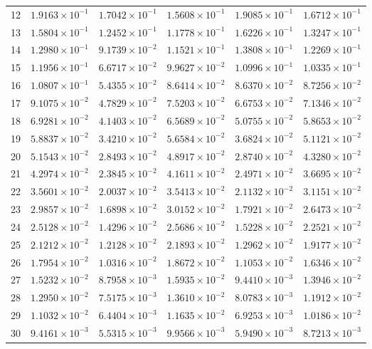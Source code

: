 \begin{table}[H]
\begin{tabular}{@{}rrrrrr@{}}
12 & $1.9163\times10^{-1}$ & $1.7042\times10^{-1}$ & $1.5608\times10^{-1}$ & $1.9085\times10^{-1}$ & $1.6712\times10^{-1}$\\
13 & $1.5804\times10^{-1}$ & $1.2452\times10^{-1}$ & $1.1778\times10^{-1}$ & $1.6226\times10^{-1}$ & $1.3247\times10^{-1}$\\
14 & $1.2980\times10^{-1}$ & $9.1739\times10^{-2}$ & $1.1521\times10^{-1}$ & $1.3808\times10^{-1}$ & $1.2269\times10^{-1}$\\
15 & $1.1956\times10^{-1}$ & $6.6717\times10^{-2}$ & $9.9627\times10^{-2}$ & $1.0996\times10^{-1}$ & $1.0335\times10^{-1}$\\
16 & $1.0807\times10^{-1}$ & $5.4355\times10^{-2}$ & $8.6414\times10^{-2}$ & $8.6370\times10^{-2}$ & $8.7256\times10^{-2}$\\
17 & $9.1075\times10^{-2}$ & $4.7829\times10^{-2}$ & $7.5203\times10^{-2}$ & $6.6753\times10^{-2}$ & $7.1346\times10^{-2}$\\
18 & $6.9281\times10^{-2}$ & $4.1403\times10^{-2}$ & $6.5689\times10^{-2}$ & $5.0755\times10^{-2}$ & $5.8653\times10^{-2}$\\
19 & $5.8837\times10^{-2}$ & $3.4210\times10^{-2}$ & $5.6584\times10^{-2}$ & $3.6824\times10^{-2}$ & $5.1121\times10^{-2}$\\
20 & $5.1543\times10^{-2}$ & $2.8493\times10^{-2}$ & $4.8917\times10^{-2}$ & $2.8740\times10^{-2}$ & $4.3280\times10^{-2}$\\
21 & $4.2974\times10^{-2}$ & $2.3845\times10^{-2}$ & $4.1611\times10^{-2}$ & $2.4971\times10^{-2}$ & $3.6695\times10^{-2}$\\
22 & $3.5601\times10^{-2}$ & $2.0037\times10^{-2}$ & $3.5413\times10^{-2}$ & $2.1132\times10^{-2}$ & $3.1151\times10^{-2}$\\
23 & $2.9857\times10^{-2}$ & $1.6898\times10^{-2}$ & $3.0152\times10^{-2}$ & $1.7921\times10^{-2}$ & $2.6473\times10^{-2}$\\
24 & $2.5128\times10^{-2}$ & $1.4296\times10^{-2}$ & $2.5686\times10^{-2}$ & $1.5228\times10^{-2}$ & $2.2521\times10^{-2}$\\
25 & $2.1212\times10^{-2}$ & $1.2128\times10^{-2}$ & $2.1893\times10^{-2}$ & $1.2962\times10^{-2}$ & $1.9177\times10^{-2}$\\
26 & $1.7954\times10^{-2}$ & $1.0316\times10^{-2}$ & $1.8672\times10^{-2}$ & $1.1053\times10^{-2}$ & $1.6346\times10^{-2}$\\
27 & $1.5232\times10^{-2}$ & $8.7958\times10^{-3}$ & $1.5935\times10^{-2}$ & $9.4410\times10^{-3}$ & $1.3946\times10^{-2}$\\
28 & $1.2950\times10^{-2}$ & $7.5175\times10^{-3}$ & $1.3610\times10^{-2}$ & $8.0783\times10^{-3}$ & $1.1912\times10^{-2}$\\
29 & $1.1032\times10^{-2}$ & $6.4404\times10^{-3}$ & $1.1635\times10^{-2}$ & $6.9253\times10^{-3}$ & $1.0186\times10^{-2}$\\
30 & $9.4161\times10^{-3}$ & $5.5315\times10^{-3}$ & $9.9566\times10^{-3}$ & $5.9490\times10^{-3}$ & $8.7213\times10^{-3}$\\
\bottomrule
\end{tabular}
\end{table}

